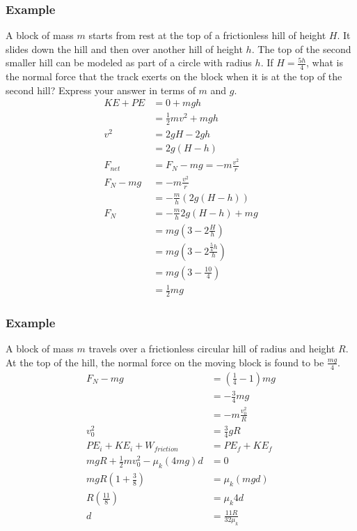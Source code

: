 \documentclass[letterpaper, 12pt]{math}
\begin{document}
\subsubsection*{Example}
A block of mass \( m \) starts from rest at the top of a frictionless hill of
height \( H \). It slides down the hill and then over another hill of height
\( h \). The top of the second smaller hill can be modeled as part of a circle
with radius \( h \). If \( H = \frac{5h}{4} \), what is the normal force that
the track exerts on the block when it is at the top of the second hill? Express
your answer in terms of \( m \) and \( g \).
\begin{align*}
  KE+PE &= 0+mgh \\
  &= \frac{1}{2}mv^2+mgh \\
  v^2 &= 2gH-2gh \\
  &= 2g(H-h) \\
  F_{net} &= F_N-mg = -m\frac{v^2}{r} \\
  F_N-mg &= -m\frac{v^2}{r} \\
  &= -\frac{m}{h}(2g(H-h)) \\
  F_N &= -\frac{m}{h}2g(H-h)+mg \\
  &= mg(3-2\frac{H}{h}) \\
  &= mg(3-2\frac{\frac{5}{4}h}{h}) \\
  &= mg(3-\frac{10}{4}) \\
  &= \frac{1}{2}mg
\end{align*}

\subsubsection*{Example}
A block of mass \( m \) travels over a frictionless circular hill of radius and
height \( R \). At the top of the hill, the normal force on the moving block is
found to be \( \frac{mg}{4} \).
\begin{align*}
  F_N-mg &= (\frac{1}{4}-1)mg \\
  &= -\frac{3}{4}mg \\
  &= -m\frac{v_0^2}{R} \\
  v_0^2 &= \frac{3}{4}gR \\
  PE_i+KE_i+W_{friction} &= PE_f+KE_f \\
  mgR+\frac{1}{2}mv_0^2-\mu_k(4mg)d &= 0 \\
  mgR(1+\frac{3}{8}) &= \mu_k(mgd) \\
  R(\frac{11}{8}) &= \mu_k4d \\
  d &= \frac{11R}{32\mu_k}
\end{align*}
\end{document}
